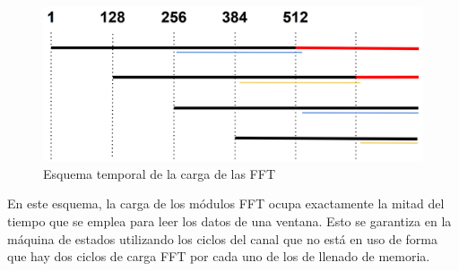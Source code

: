 \begin{figure}[!hb]
\begin{center}
\includegraphics[width=12cm]{img/esqfft.png}
\caption{\label{fig:esq_fft}Esquema temporal de la carga de las FFT}
\end{center}
\end{figure}

En este esquema, la carga de los módulos FFT ocupa exactamente la mitad del tiempo que se emplea para leer los datos de una ventana. Esto se garantiza en la máquina de estados utilizando los ciclos del canal que no está en uso de forma que hay dos ciclos de carga FFT por cada uno de los de llenado de memoria.

